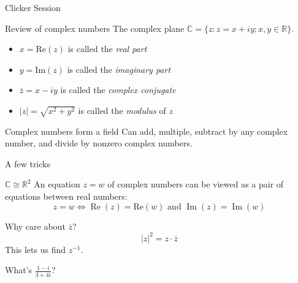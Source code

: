 \documentclass{beamer}
\newcommand{\C}{\mathbb{C}}
\newcommand{\R}{\mathbb{R}}
\DeclareMathOperator{\Real}{Re}
\DeclareMathOperator{\Imag}{Im}
\begin{document}
\begin{frame}[plain,c]

\begin{center}

\Huge

Clicker Session
\end{center}

\end{frame}

\begin{frame}{Review of complex numbers}
  The complex plane $\C=\{z: z=x+iy; x,y\in\R\}$.
  \begin{itemize}
  \item $x=\text{Re}(z)$ is called the \emph{real part} 
  \item $y=\text{Im}(z)$ is called the \emph{imaginary part} 
  \item $\overline{z}=x-iy$ is called the \emph{complex conjugate} 
  \item $|z|=\sqrt{x^2+y^2}$ is called the \emph{modulus} of $z$

  \end{itemize}
  \begin{block}{Complex numbers form a field}
Can add, multiple, subtract by any complex number, and divide by nonzero complex numbers.
\end{block}

\end{frame}

\begin{frame}{A few tricks}
  \begin{block}{$\C\cong\R^2$}
    An equation $z=w$ of complex numbers can be viewed as a pair of equations between real numbers:
$$z=w \iff  \Real(z)=\text{Re}(w) \text{ and } \Imag(z)=\Imag(w)$$
  \end{block}

  \begin{block}{Why care about $\overline{z}$?}
    $$|z|^2=z\cdot \overline{z}$$
    This lets us find $z^{-1}$.
\end{block}
  \begin{example}What's $\frac{1-i}{3+4i}$?

    \end{example}

\end{frame}
\end{document}

